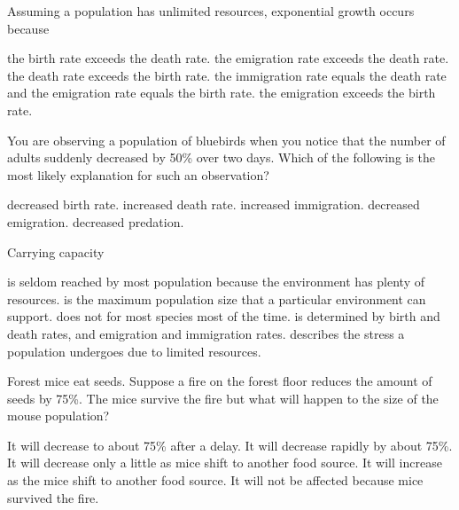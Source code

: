 \question
Assuming a population has unlimited resources, exponential growth occurs because

\begin{choices}
\correctchoice the birth rate exceeds the death rate.%
\choice the emigration rate exceeds the death rate.%
\choice the death rate exceeds the birth rate.%
\choice the immigration rate equals the death rate and the emigration rate equals the birth rate.%
\choice the emigration exceeds the birth rate.%
\end{choices}


\question
You are observing a population of bluebirds when you notice that the number of adults suddenly decreased by 50\% over two days. Which of the following is the most likely explanation for such an observation?

\begin{choices}
\choice decreased birth rate.%
\correctchoice increased death rate.%
\choice increased immigration.%
\choice decreased emigration.%
\choice decreased predation.%
\end{choices}


\question
Carrying capacity

\begin{choices}
\choice is seldom reached by most population because the environment has plenty of resources.%
\correctchoice is the maximum population size that a particular environment can support.%
\choice does not for most species most of the time.%
\choice is determined by birth and death rates, and emigration and immigration rates.%
\choice describes the stress a population undergoes due to limited resources.%
\end{choices}



\question
Forest mice eat seeds. Suppose a fire on the forest floor reduces the amount of seeds by 75\%. The mice survive the fire but what will happen to the size of the mouse population?

\begin{choices}
\correctchoice It will decrease to about 75\% after a delay. %
\choice It will decrease rapidly by about 75\%. %
\choice It will decrease only a little as mice shift to another food source. %
\choice It will increase as the mice shift to another food source. %
\choice It will not be affected because mice survived the fire. %
\end{choices}



